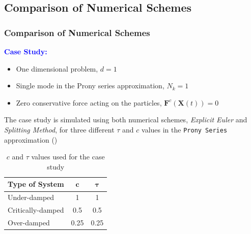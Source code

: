 \documentclass[a4paper,10pt]{beamer}
\newcommand{\BS}[1]{\boldsymbol{#1}}
\newcommand{\rb}[1]{\left( #1 \right)}
\begin{document}
	\begin{frame}
		\subsection{Comparison of Numerical Schemes}
		\frametitle{Comparison of Numerical Schemes}
		\textcolor{blue}{\textbf{Case Study:}}
		\begin{itemize}
			\item {One dimensional problem, $d = 1$}
			\item {Single mode in the Prony series approximation, $N_{k} = 1$}
			\item {Zero conservative force acting on the particles, $\BS{F}^{c}\rb{\BS{X}(t)} = 0$}
		\end{itemize}
		The case study is simulated using both numerical schemes, \textit{Explicit Euler} and \textit{Splitting Method}, for three different $\tau$ and $c$ values in the \texttt{Prony Series} approximation ()
		\begin{table}[H]
			\begin{tabular}{| p{2.6cm} | c | c |}
				\hline
				\textbf{Type of System} & $\BS{c}$ & $\BS{\tau}$ \\
				\hline
				Under-damped & 1 & 1 \\
				Critically-damped & 0.5 & 0.5 \\
				Over-damped & 0.25 & 0.25 \\
				\hline
			\end{tabular}
			\caption{$c$ and $\tau$ values used for the case study}
			\label{tab:cTauBaseCase}
		\end{table}
	\end{frame}
\end{document}
